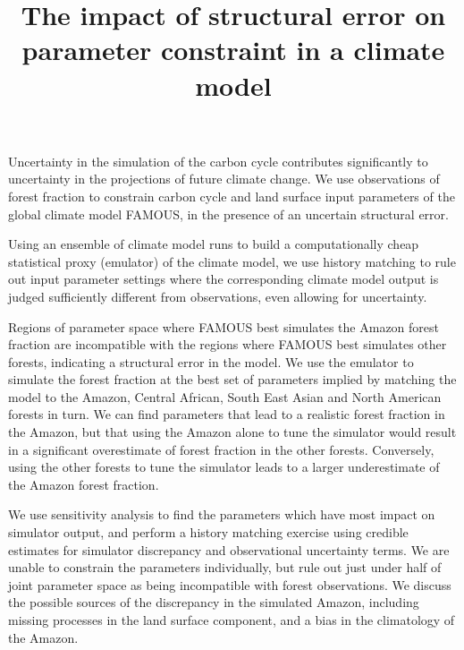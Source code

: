 \documentclass[esd, manuscript]{copernicus} %
\begin{document}
\title{The impact of structural error on parameter constraint in a climate model}





\maketitle

Uncertainty in the simulation of the carbon cycle contributes significantly to uncertainty in the projections of future climate change. We use observations of forest fraction to constrain carbon cycle and land surface input parameters of the global climate model FAMOUS, in the presence of an uncertain structural error. 

Using an ensemble of climate model runs to build a computationally cheap statistical proxy (emulator) of the climate model, we use history matching to rule out input parameter settings where the corresponding climate model output is judged sufficiently different from observations, even allowing for uncertainty.

Regions of parameter space where FAMOUS best simulates the Amazon forest fraction are incompatible with the regions where FAMOUS best simulates other forests, indicating a structural error in the model. We use the emulator to simulate the forest fraction at the best set of parameters implied by matching the model to the Amazon, Central African, South East Asian and North American forests in turn. We can find parameters that lead to a realistic forest fraction in the Amazon, but that using the Amazon alone to tune the simulator would result in a significant overestimate of forest fraction in the other forests. Conversely, using the other forests to tune the simulator leads to a larger underestimate of the Amazon forest fraction.

We use sensitivity analysis to find the parameters which have most impact on simulator output, and perform a history matching exercise using credible estimates for simulator discrepancy and observational uncertainty terms. We are unable to constrain the parameters individually, but rule out just under half of joint parameter space as being incompatible with forest observations. We discuss the possible sources of the discrepancy in the simulated Amazon, including missing processes in the land surface component, and a bias in the climatology of the Amazon.
\end{document}
